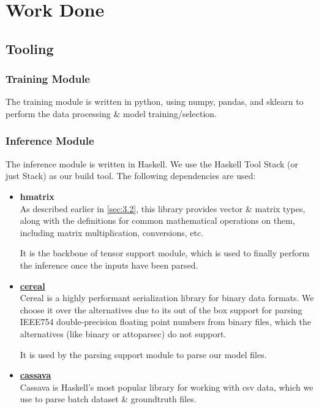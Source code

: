 \documentclass[12pt, titlepage]{article}
\begin{document}
\section{Work Done}
\subsection{Tooling}
\subsubsection{Training Module}
The training module is written in python, using numpy, pandas, and sklearn to perform the data processing \& model training/selection.\bigskip

\subsubsection{Inference Module}
The inference module is written in Haskell. We use the Haskell Tool Stack (or just Stack) as our build tool. The following dependencies are used:
\begin{itemize}
	\item \textbf{hmatrix}\\
	As described earlier in \ref{sec:3.2}, this library provides vector \& matrix types, along with the definitions for common mathematical operations on them, including matrix multiplication, conversions, etc.\bigskip

	It is the backbone of tensor support module, which is used to finally perform the inference once the inputs have been parsed.

	\item \textbf{\href{https://hackage.haskell.org/package/cereal}{cereal}}\\
	Cereal is a highly performant serialization library for binary data formats. We choose it over the alternatives due to its out of the box support for parsing IEEE754 double-precision floating point numbers from binary files, which the alternatives (like binary or attoparsec) do not support.\bigskip

	It is used by the parsing support module to parse our model files.

	\item \textbf{\href{https://hackage.haskell.org/package/cassava-0.5.3.1}{cassava}}\\
	Cassava is Haskell's most popular library for working with csv data, which we use to parse batch dataset \& groundtruth files.
\end{itemize}
\end{document}
